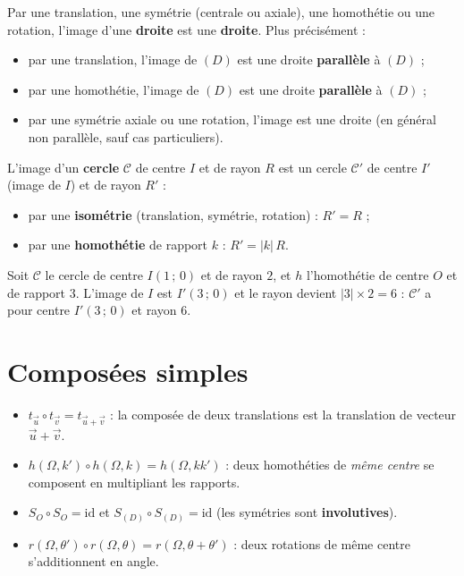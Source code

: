 \begin{theoreme}
Par une translation, une symétrie (centrale ou axiale), une homothétie ou une
rotation, l'image d'une \textbf{droite} est une \textbf{droite}. Plus précisément :
\begin{itemize}
  \item par une translation, l'image de $(D)$ est une droite \textbf{parallèle} à $(D)$ ;
  \item par une homothétie, l'image de $(D)$ est une droite \textbf{parallèle} à $(D)$ ;
  \item par une symétrie axiale ou une rotation, l'image est une droite (en général
        non parallèle, sauf cas particuliers).
\end{itemize}
\end{theoreme}

\begin{theoreme}
L'image d'un \textbf{cercle} $\mathcal{C}$ de centre $I$ et de rayon $R$ est un cercle
$\mathcal{C}'$ de centre $I'$ (image de $I$) et de rayon $R'$ :
\begin{itemize}
  \item par une \textbf{isométrie} (translation, symétrie, rotation) : $R'=R$ ;
  \item par une \textbf{homothétie} de rapport $k$ : $R'=|k|\,R$.
\end{itemize}
\end{theoreme}

\begin{exemple}
Soit $\mathcal{C}$ le cercle de centre $I(1\,;\,0)$ et de rayon $2$, et $h$
l'homothétie de centre $O$ et de rapport $3$. L'image de $I$ est $I'(3\,;\,0)$ et le
rayon devient $|3|\times 2=6$ : $\mathcal{C}'$ a pour centre $I'(3\,;\,0)$ et rayon $6$.
\end{exemple}

\section{Composées simples}

\begin{propriete}
\begin{itemize}
  \item $t_{\vec u}\circ t_{\vec v}=t_{\vec u+\vec v}$ : la composée de deux
        translations est la translation de vecteur $\vec u+\vec v$.
  \item $h(\Omega,k')\circ h(\Omega,k)=h(\Omega,kk')$ : deux homothéties de
        \emph{même centre} se composent en multipliant les rapports.
  \item $S_O\circ S_O=\mathrm{id}$ et $S_{(D)}\circ S_{(D)}=\mathrm{id}$ (les
        symétries sont \textbf{involutives}).
  \item $r(\Omega,\theta')\circ r(\Omega,\theta)=r(\Omega,\theta+\theta')$ : deux
        rotations de même centre s'additionnent en angle.
\end{itemize}
\end{propriete}

